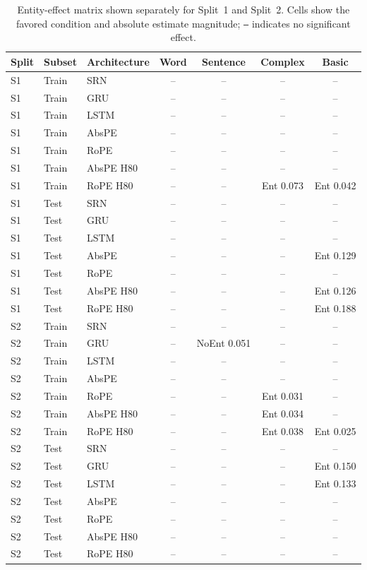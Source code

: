\begin{table}[t]
\centering\scriptsize
\setlength{\tabcolsep}{3pt}
\begin{tabular}{@{}lllcccc@{}}
\toprule
\textbf{Split} & \textbf{Subset} & \textbf{Architecture} & \textbf{Word} & \textbf{Sentence} & \textbf{Complex} & \textbf{Basic} \\
\midrule
S1 & Train & SRN & -- & -- & -- & -- \\
S1 & Train & GRU & -- & -- & -- & -- \\
S1 & Train & LSTM & -- & -- & -- & -- \\
S1 & Train & AbsPE & -- & -- & -- & -- \\
S1 & Train & RoPE & -- & -- & -- & -- \\
S1 & Train & AbsPE H80 & -- & -- & -- & -- \\
S1 & Train & RoPE H80 & -- & -- & Ent 0.073 & Ent 0.042 \\
S1 & Test & SRN & -- & -- & -- & -- \\
S1 & Test & GRU & -- & -- & -- & -- \\
S1 & Test & LSTM & -- & -- & -- & -- \\
S1 & Test & AbsPE & -- & -- & -- & Ent 0.129 \\
S1 & Test & RoPE & -- & -- & -- & -- \\
S1 & Test & AbsPE H80 & -- & -- & -- & Ent 0.126 \\
S1 & Test & RoPE H80 & -- & -- & -- & Ent 0.188 \\
S2 & Train & SRN & -- & -- & -- & -- \\
S2 & Train & GRU & -- & NoEnt 0.051 & -- & -- \\
S2 & Train & LSTM & -- & -- & -- & -- \\
S2 & Train & AbsPE & -- & -- & -- & -- \\
S2 & Train & RoPE & -- & -- & Ent 0.031 & -- \\
S2 & Train & AbsPE H80 & -- & -- & Ent 0.034 & -- \\
S2 & Train & RoPE H80 & -- & -- & Ent 0.038 & Ent 0.025 \\
S2 & Test & SRN & -- & -- & -- & -- \\
S2 & Test & GRU & -- & -- & -- & Ent 0.150 \\
S2 & Test & LSTM & -- & -- & -- & Ent 0.133 \\
S2 & Test & AbsPE & -- & -- & -- & -- \\
S2 & Test & RoPE & -- & -- & -- & -- \\
S2 & Test & AbsPE H80 & -- & -- & -- & -- \\
S2 & Test & RoPE H80 & -- & -- & -- & -- \\
\bottomrule
\end{tabular}
\caption{\small Entity-effect matrix shown separately for Split~1 and Split~2. Cells show the favored condition and absolute estimate magnitude; \texttt{--} indicates no significant effect.}
\label{tab:gap_per_split_entity_matrix}
\end{table}
